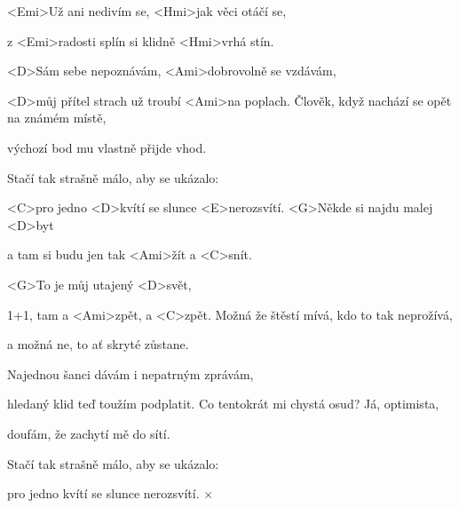 
\zs
<Emi>Už ani nedivím se, <Hmi>jak věci otáčí se,

z <Emi>radosti splín si klidně <Hmi>vrhá stín.

<D>Sám sebe nepoznávám, <Ami>dobrovolně se vzdávám,

<D>můj přítel strach už troubí <Ami>na poplach.
\ks
\zs
Člověk, když nachází se opět na známém místě,

výchozí bod mu vlastně přijde vhod.

Stačí tak strašně málo, aby se ukázalo:

<C>pro jedno <D>kvítí se slunce <E>nerozsvítí.
\ks
\zr
<G>Někde si najdu malej <D>byt

a tam si budu jen tak <Ami>žít a <C>snít.

<G>To je můj utajený <D>svět,

1+1, tam a <Ami>zpět, a <C>zpět.
\kr
\zs
Možná že štěstí mívá, kdo to tak neprožívá,

a možná ne, to ať skryté zůstane.

Najednou šanci dávám i nepatrným zprávám,

hledaný klid teď toužím podplatit.
\ks
\zs
Co tentokrát mi chystá osud? Já, optimista,

doufám, že zachytí mě do sítí.

Stačí tak strašně málo, aby se ukázalo:

pro jedno kvítí se slunce nerozsvítí.
\ks
{}×
\kr
\kp



